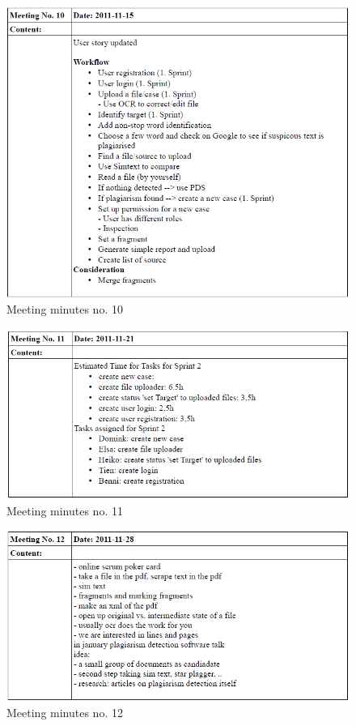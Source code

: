 \begin{appendix}
\begin{figure}[htbp]
  \centering
    \includegraphics[width=\textwidth]{images/a_meetings/meeting_10}
  \caption{Meeting minutes no. 10}
  \label{fig:meeting minutes no. 10}
\end{figure}

\begin{figure}[htbp]
  \centering
    \includegraphics[width=\textwidth]{images/a_meetings/meeting_11}
  \caption{Meeting minutes no. 11}
  \label{fig:meeting minutes no. 11}
\end{figure}

\begin{figure}[htbp]
  \centering
    \includegraphics[width=\textwidth]{images/a_meetings/meeting_12}
  \caption{Meeting minutes no. 12}
  \label{fig:meeting minutes no. 12}
\end{figure}


\end{appendix}
